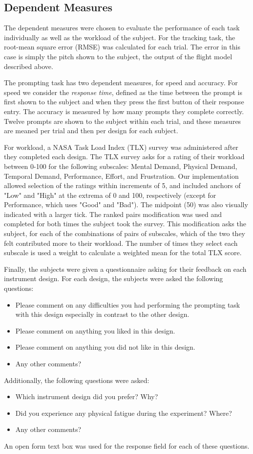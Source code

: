 \subsection{Dependent Measures}

The dependent measures were chosen to evaluate the performance of each task individually as well as the workload of the subject.
For the tracking task, the root-mean square error (RMSE) was calculated for each trial.
The error in this case is simply the pitch shown to the subject, the output of the flight model described above.

The prompting task has two dependent measures, for speed and accuracy.
For speed we consider the \textit{response time}, defined as the time between the prompt is first shown to the subject and when they press the first button of their response entry.
The accuracy is measured by how many prompts they complete correctly.
Twelve prompts are shown to the subject within each trial, and these measures are meaned per trial and then per design for each subject.

For workload, a NASA Task Load Index (TLX) survey was administered after they completed each design.
The TLX survey asks for a rating of their workload between 0-100 for the following subscales: Mental Demand, Physical Demand, Temporal Demand, Performance, Effort, and Frustration.
Our implementation allowed selection of the ratings within increments of 5, and included anchors of "Low" and "High" at the extrema of 0 and 100, respectively (except for Performance, which uses "Good" and "Bad").
The midpoint (50) was also visually indicated with a larger tick.
The ranked pairs modification was used and completed for both times the subject took the survey.
This modification asks the subject, for each of the combinations of pairs of subscales, which of the two they felt contributed more to their workload.
The number of times they select each subscale is used a weight to calculate a weighted mean for the total TLX score.

Finally, the subjects were given a questionnaire asking for their feedback on each instrument design.
For each design, the subjects were asked the following questions:
\begin{itemize}
    \item Please comment on any difficulties you had performing the prompting task with this design especially in contrast to the other design.
    \item Please comment on anything you liked in this design.
    \item Please comment on anything you did not like in this design.
    \item Any other comments?
\end{itemize}
Additionally, the following questions were asked:
\begin{itemize}
    \item Which instrument design did you prefer? Why?
    \item Did you experience any physical fatigue during the experiment? Where?
    \item Any other comments?
\end{itemize}
An open form text box was used for the response field for each of these questions.

